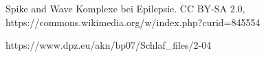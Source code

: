 Spike and Wave Komplexe bei Epilepsie. CC BY-SA 2.0, https://commons.wikimedia.org/w/index.php?curid=845554

https://www.dpz.eu/akn/bp07/Schlaf_files/2-04%